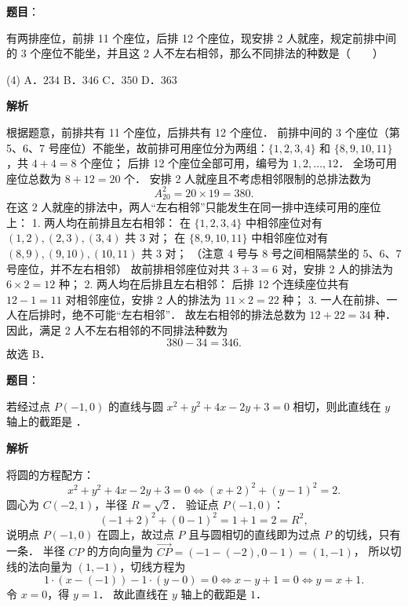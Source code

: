 \begin{answer}

\textbf{题目}：

有两排座位，前排 11 个座位，后排 12 个座位，现安排 2 人就座，规定前排中间的 3 个座位不能坐，并且这 2 人不左右相邻，那么不同排法的种数是\mbox{（　　）}

\begin{gkopts}(4)
\task A．$234$
\task B．$346$
\task C．$350$
\task D．$363$
\end{gkopts}

\textbf{解析}

根据题意，前排共有 11 个座位，后排共有 12 个座位．
前排中间的 3 个座位（第 5、6、7 号座位）不能坐，故前排可用座位分为两组：$\{1, 2, 3, 4\}$ 和 $\{8, 9, 10, 11\}$，共 $4 + 4 = 8$ 个座位；
后排 12 个座位全部可用，编号为 $1, 2, \dots, 12$．
全场可用座位总数为 $8 + 12 = 20$ 个．
安排 2 人就座且不考虑相邻限制的总排法数为
\nopagebreak[4]
\[
A_{20}^2 = 20 \times 19 = 380.
\]
在这 2 人就座的排法中，两人“左右相邻”只能发生在同一排中连续可用的座位上：
1. 两人均在前排且左右相邻：
   在 $\{1, 2, 3, 4\}$ 中相邻座位对有 $(1,2), (2,3), (3,4)$ 共 3 对；
   在 $\{8, 9, 10, 11\}$ 中相邻座位对有 $(8,9), (9,10), (10,11)$ 共 3 对；
   （注意 4 号与 8 号之间相隔禁坐的 5、6、7 号座位，并不左右相邻）
   故前排相邻座位对共 $3 + 3 = 6$ 对，安排 2 人的排法为 $6 \times 2 = 12$ 种；
2. 两人均在后排且左右相邻：
   后排 12 个连续座位共有 $12 - 1 = 11$ 对相邻座位，安排 2 人的排法为 $11 \times 2 = 22$ 种；
3. 一人在前排、一人在后排时，绝不可能“左右相邻”．
故左右相邻的排法总数为 $12 + 22 = 34$ 种．
因此，满足 2 人不左右相邻的不同排法种数为
\nopagebreak[4]
\[
380 - 34 = 346.
\]
故选 B．


\end{answer}
\begin{answer}

\textbf{题目}：

若经过点 $P(-1, 0)$ 的直线与圆 $x^2 + y^2 + 4x - 2y + 3 = 0$ 相切，则此直线在 $y$ 轴上的截距是 \underline{\hspace{3cm}}．

\textbf{解析}

将圆的方程配方：
\nopagebreak[4]
\[
x^2 + y^2 + 4x - 2y + 3 = 0 \iff (x + 2)^2 + (y - 1)^2 = 2.
\]
圆心为 $C(-2, 1)$，半径 $R = \sqrt{2}$．
验证点 $P(-1, 0)$：
\nopagebreak[4]
\[
(-1 + 2)^2 + (0 - 1)^2 = 1 + 1 = 2 = R^2,
\]
说明点 $P(-1, 0)$ 在圆上，故过点 $P$ 且与圆相切的直线即为过点 $P$ 的切线，只有一条．
半径 $CP$ 的方向向量为 $\vec{CP} = (-1 - (-2), 0 - 1) = (1, -1)$，
所以切线的法向量为 $(1, -1)$，切线方程为
\nopagebreak[4]
\[
1 \cdot (x - (-1)) - 1 \cdot (y - 0) = 0 \iff x - y + 1 = 0 \iff y = x + 1.
\]
令 $x = 0$，得 $y = 1$．
故此直线在 $y$ 轴上的截距是 $1$．


\end{answer}
